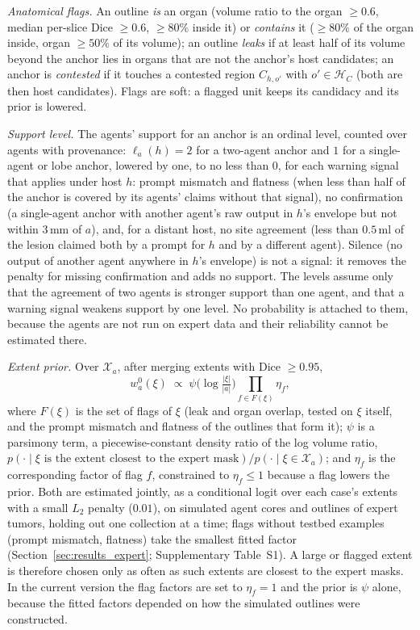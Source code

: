 \documentclass[fleqn,10pt]{olplainarticle}
\begin{document}
\emph{Anatomical flags.} An outline \emph{is} an organ (volume ratio to the organ $\ge0.6$, median per-slice Dice $\ge0.6$,
$\ge80\%$ inside it) or \emph{contains} it ($\ge80\%$ of the organ inside, organ $\ge50\%$ of its volume); an outline
\emph{leaks} if at least half of its volume beyond the anchor lies in organs that are not the anchor's host candidates;
an anchor is \emph{contested} if it touches a contested region $C_{h,o'}$ with $o'\in\mathcal{H}_C$ (both are then host
candidates). Flags are soft: a flagged unit keeps its candidacy and its prior is lowered.

\emph{Support level.} The agents' support for an anchor is an ordinal level, counted over agents with provenance:
$\ell_a(h)=2$ for a two-agent anchor and $1$ for a single-agent or lobe anchor, lowered by one, to no less than $0$, for
each warning signal that applies under host $h$: prompt mismatch and flatness (when less than half of the anchor is
covered by its agents' claims without that signal), no confirmation (a single-agent anchor with another agent's raw output
in $h$'s envelope but not within $3$\,mm of $a$), and, for a distant host, no site agreement (less than $0.5$\,ml of the
lesion claimed both by a prompt for $h$ and by a different agent). Silence (no output of another agent anywhere in $h$'s
envelope) is not a signal: it removes the penalty for missing confirmation and adds no support. The levels assume only
that the agreement of two agents is stronger support than one agent, and that a warning signal weakens support by one
level. No probability is attached to them, because the agents are not run on expert data and their reliability cannot be
estimated there.

\emph{Extent prior.} Over $\mathcal{X}_a$, after merging extents with Dice $\ge0.95$,
\begin{equation}
\label{eq:extent_prior}
w^0_a(\xi)\;\propto\;\psi\bigl(\log\tfrac{|\xi|}{|a|}\bigr)\prod_{f\in F(\xi)}\eta_f,
\end{equation}
where $F(\xi)$ is the set of flags of $\xi$ (leak and organ overlap, tested on $\xi$ itself, and the prompt mismatch and
flatness of the outlines that form it); $\psi$ is a parsimony term, a piecewise-constant density ratio of the log volume
ratio, $p(\cdot\mid\xi\text{ is the extent closest to the expert mask})/p(\cdot\mid\xi\in\mathcal{X}_a)$; and $\eta_f$ is
the corresponding factor of flag $f$, constrained to $\eta_f\le1$ because a flag lowers the prior. Both are estimated
jointly, as a conditional logit over each case's extents with a small $L_2$ penalty ($0.01$), on simulated agent cores
and outlines of expert tumors, holding out one collection at a time; flags without testbed examples (prompt mismatch,
flatness) take the smallest fitted factor (Section~\ref{sec:results_expert}; Supplementary Table~S1). A large or
flagged extent is therefore chosen only as often as such extents are closest to the expert masks. In the current version
the flag factors are set to $\eta_f=1$ and the prior is $\psi$ alone, because the fitted factors depended on how the
simulated outlines were constructed.
\end{document}
